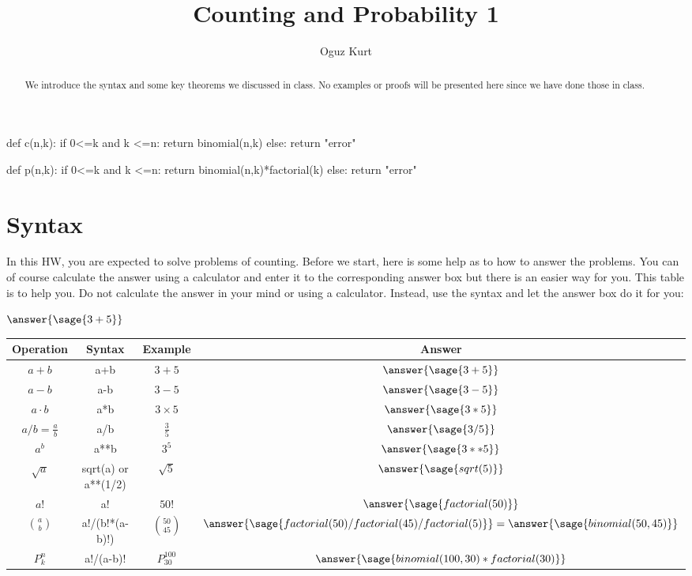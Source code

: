 \documentclass{ximera}
\title{Counting and Probability 1}
\author{Oguz Kurt}
\begin{document}
\begin{abstract}
We introduce the syntax and some key theorems we discussed in class. No examples or proofs will be presented here since we have done those in class.
\end{abstract}
\maketitle


\begin{sagesilent}
def c(n,k):
    if 0<=k and k <=n:
        return binomial(n,k)
    else:
        return "error"

def p(n,k):
    if 0<=k and k <=n:
        return binomial(n,k)*factorial(k)
    else:
        return "error"

\end{sagesilent}

\section*{Syntax}
In this HW, you are expected to solve problems of counting. Before we start, here is some help as to how to answer the problems. You can of course calculate the answer using a calculator and enter it to the corresponding answer box but there is an easier way for you. This table is to help you. Do not calculate the answer in your mind or using a calculator. Instead, use the syntax and let the answer box do it for you:

\hspace{0.5cm}

$\answer{\sage{3+5} }$

\begin{tabular}{c|c|c|c}
Operation & Syntax & Example & Answer 
\\
\hline
$a+b$ & {\color{red} a+b} & $3+5$ & $\answer{\sage{3+5} }$
\\
\hline
$a- b$ & {\color{red} a-b} & $3-5$ & $\answer{\sage{3-5} }$
\\
\hline
$a\cdot b$ & {\color{red} a*b} & $3\times 5$ & $\answer{\sage{3*5} }$
\\
\hline
$a/b=\frac{a}{b}$ & {\color{red} a/b} & $\frac{3}{5}$ & $\answer{\sage{3/5} }$
\\
\hline
$a^b$ & {\color{red} a**b} & $3^5$ & $\answer{\sage{3**5} }$
\\
\hline
$\sqrt{a}$ & {\color{red} sqrt(a) or a**(1/2)} & $\sqrt{5}$ & $\answer{\sage{sqrt(5)} }$
\\
\hline
$a!$ & {\color{red} a!} & $50!$ & $\answer{\sage{factorial(50)} }$
\\
\hline
$\binom{a}{b}$ & {\color{red} a!/(b!*(a-b)!)} & $\binom{50}{45}$ & $\answer{\sage{factorial(50)/factorial(45)/factorial(5)}}=\answer{\sage{binomial(50,45)}}$ 
\\
\hline
$P_k^n$ & {\color{red} a!/(a-b)!} & $P_{30}^{100}$ & $\answer{\sage{binomial(100,30)*factorial(30)} }$ 
\\
\end{tabular}
\end{document}
